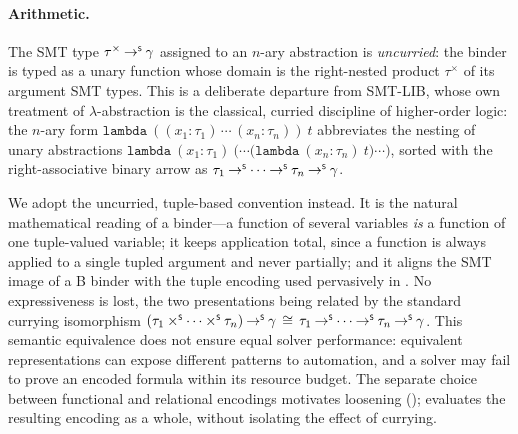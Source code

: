 \begin{definition}
  \paragraph{Arithmetic.}
\end{definition}

\begin{remark}
  \label{rem:smt-lambda-uncurried}
  The SMT type \(\tau^{\times} \mathbin{\to^{\scriptscriptstyle{\mathsf{S}}}} \gamma\) assigned to an \(n\)-ary abstraction
  is \emph{uncurried}: the binder is typed as a unary function whose domain is the
  right-nested product \(\tau^{\times}\) of its argument SMT types. This is a
  deliberate departure from SMT-LIB, whose own treatment of \(\lambda\)-abstraction
  is the classical, curried discipline of higher-order logic: the \(n\)-ary form
  \(\mathtt{lambda}\ ((x_1 : \tau_1)\, \cdots\, (x_n : \tau_n))\ t\) abbreviates the nesting
  of unary abstractions
  \(\mathtt{lambda}\ (x_1 : \tau_1)\ \bigl(\cdots \bigl(\mathtt{lambda}\ (x_n : \tau_n)\ t\bigr) \cdots\bigr)\),
  sorted with the right-associative binary arrow as
  \(\tau_1 \mathbin{\to^{\scriptscriptstyle{\mathsf{S}}}} \cdots \mathbin{\to^{\scriptscriptstyle{\mathsf{S}}}} \tau_n \mathbin{\to^{\scriptscriptstyle{\mathsf{S}}}} \gamma\).

  We adopt the uncurried, tuple-based convention instead. It is the natural
  mathematical reading of a binder---a function of several variables \emph{is} a
  function of one tuple-valued variable; it keeps application total, since a
  function is always applied to a single tupled argument and never partially; and
  it aligns the SMT image of a B binder with the tuple encoding used pervasively in
  . No expressiveness is lost, the two presentations being related by
  the standard currying isomorphism
  \((\tau_1 \mathbin{\times^{\scriptscriptstyle{\mathsf{S}}}} \cdots \mathbin{\times^{\scriptscriptstyle{\mathsf{S}}}} \tau_n) \mathbin{\to^{\scriptscriptstyle{\mathsf{S}}}} \gamma \,\cong\, \tau_1 \mathbin{\to^{\scriptscriptstyle{\mathsf{S}}}} \cdots \mathbin{\to^{\scriptscriptstyle{\mathsf{S}}}} \tau_n \mathbin{\to^{\scriptscriptstyle{\mathsf{S}}}} \gamma\).
  This semantic equivalence does not ensure equal solver performance: equivalent
  representations can expose different patterns to automation, and a solver may
  fail to prove an encoded formula within its resource budget. The separate choice
  between functional and relational encodings motivates loosening
  ();  evaluates the resulting
  encoding as a whole, without isolating the effect of currying.
\end{remark}

